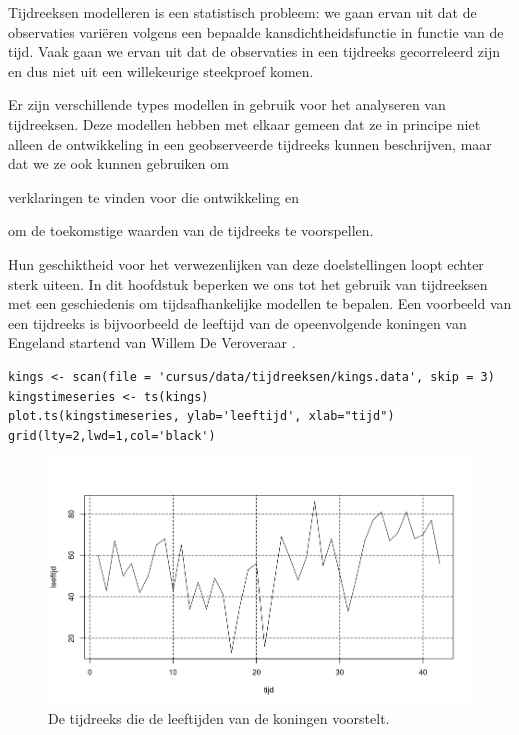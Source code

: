 Tijdreeksen modelleren is een statistisch probleem: we gaan ervan uit dat de observaties variëren volgens een bepaalde kansdichtheidsfunctie in functie van de tijd. Vaak gaan we ervan uit dat de observaties in een tijdreeks gecorreleerd zijn en dus niet uit een willekeurige steekproef komen. 

Er zijn verschillende types modellen in gebruik voor het analyseren van tijdreeksen. Deze modellen hebben met elkaar gemeen dat ze in principe niet alleen de ontwikkeling in een geobserveerde tijdreeks kunnen beschrijven, maar dat we ze ook kunnen gebruiken om
\begin{inparaenum}[(i)]
	\item verklaringen te vinden voor die ontwikkeling en
	\item om de toekomstige waarden van de tijdreeks te voorspellen.
\end{inparaenum}
Hun geschiktheid voor het verwezenlijken van deze doelstellingen loopt echter sterk uiteen. In dit hoofdstuk beperken we ons tot het gebruik van tijdreeksen met een geschiedenis om tijdsafhankelijke modellen te bepalen. Een voorbeeld van een tijdreeks is bijvoorbeeld de leeftijd van de opeenvolgende koningen van Engeland startend van Willem De Veroveraar \autocite{Hipel1994}.

\begin{lstlisting}
kings <- scan(file = 'cursus/data/tijdreeksen/kings.data', skip = 3)
kingstimeseries <- ts(kings)
plot.ts(kingstimeseries, ylab='leeftijd', xlab="tijd")
grid(lty=2,lwd=1,col='black')
\end{lstlisting}

\begin{figure}
	\centering
	\includegraphics[width=\textwidth]{images/tijdreeksen/tijdreekskings.png}
	\caption{De tijdreeks die de leeftijden van de koningen voorstelt.}
	\label{fig:tijdreeks11}
\end{figure}

